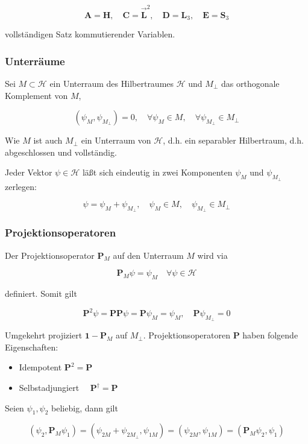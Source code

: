 \documentclass[10pt, letterpaper]{article}
\begin{document}
$$
\mathbf{A}=\mathbf{H}, \quad \mathbf{C}=\overrightarrow{\mathbf{L}}^{2}, \quad \mathbf{D}=\mathbf{L}_{3}, \quad \mathbf{E}=\mathbf{S}_{3}
$$

vollständigen Satz kommutierender Variablen.

\subsubsection*{Unterräume}
Sei $M \subset \mathcal{H}$ ein Unterraum des Hilbertraumes $\mathcal{H}$ und $M_{\perp}$ das orthogonale Komplement von $M$,

$$
\left(\psi_{M}, \psi_{M_{\perp}}\right)=0, \quad \forall \psi_{M} \in M, \quad \forall \psi_{M_{\perp}} \in M_{\perp}
$$

Wie $M$ ist auch $M_{\perp}$ ein Unterraum von $\mathcal{H}$, d.h. ein separabler Hilbertraum, d.h. abgeschlossen und vollständig.

Jeder Vektor $\psi \in \mathcal{H}$ läßt sich eindeutig in zwei Komponenten $\psi_{M}$ und $\psi_{M_{\perp}}$ zerlegen:

$$
\psi=\psi_{M}+\psi_{M_{\perp}}, \quad \psi_{M} \in M, \quad \psi_{M_{\perp}} \in M_{\perp}
$$

\subsubsection*{Projektionsoperatoren}
Der Projektionsoperator $\mathbf{P}_{M}$ auf den Unterraum $M$ wird via

$$
\mathbf{P}_{M} \psi=\psi_{M} \quad \forall \psi \in \mathcal{H}
$$

definiert. Somit gilt

$$
\mathbf{P}^{2} \psi=\mathbf{P} \mathbf{P} \psi=\mathbf{P} \psi_{M}=\psi_{M}, \quad \mathbf{P} \psi_{M_{\perp}}=0
$$

Umgekehrt projiziert $\mathbf{1 -} \mathbf{P}_{M}$ auf $M_{\perp}$. Projektionsoperatoren $\mathbf{P}$ haben folgende Eigenschaften:

\begin{itemize}
  \item Idempotent $\mathbf{P}^{2}=\mathbf{P}$
  \item Selbstadjungiert $\quad \mathbf{P}^{\dagger}=\mathbf{P}$
\end{itemize}

Seien $\psi_{1}, \psi_{2}$ beliebig, dann gilt

$$
\left(\psi_{2}, \mathbf{P}_{M} \psi_{1}\right)=\left(\psi_{2 M}+\psi_{2 M_{\perp}}, \psi_{1 M}\right)=\left(\psi_{2 M}, \psi_{1 M}\right)=\left(\mathbf{P}_{M} \psi_{2}, \psi_{1}\right)
$$
\end{document}
